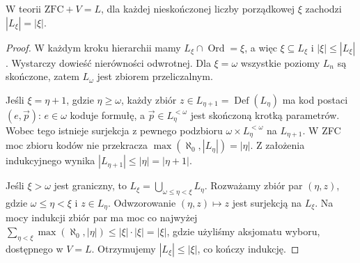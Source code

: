 \begin{lemat}
\label{lem:l-level-cardinality}
W teorii $\mathrm{ZFC}+V=L$, dla każdej nieskończonej liczby
porządkowej $\xi$ zachodzi $|L_\xi|=|\xi|$.
\end{lemat}
\begin{proof}
W każdym kroku hierarchii mamy $L_\xi\cap\operatorname{Ord}=\xi$,
a więc $\xi\subseteq L_\xi$ i $|\xi|\le |L_\xi|$.
Wystarczy dowieść nierówności odwrotnej. Dla $\xi=\omega$
wszystkie poziomy $L_n$ są skończone, zatem $L_\omega$
jest zbiorem przeliczalnym.

Jeśli $\xi=\eta+1$, gdzie $\eta\ge\omega$, każdy zbiór
$z\in L_{\eta+1}=\operatorname{Def}(L_\eta)$ ma kod postaci
$(e,\vec p)$: $e\in\omega$ koduje formułę, a
$\vec p\in L_\eta^{<\omega}$ jest skończoną krotką parametrów.
Wobec tego istnieje surjekcja z pewnego podzbioru
$\omega\times L_\eta^{<\omega}$ na $L_{\eta+1}$.
W ZFC moc zbioru kodów nie przekracza
$\max(\aleph_0,|L_\eta|)=|\eta|$.
Z założenia indukcyjnego wynika
$|L_{\eta+1}|\le|\eta|=|\eta+1|$.

Jeśli $\xi>\omega$ jest graniczny, to
$L_\xi=\bigcup_{\omega\le\eta<\xi}L_\eta$.
Rozważamy zbiór par $(\eta,z)$, gdzie
$\omega\le\eta<\xi$ i $z\in L_\eta$.
Odwzorowanie $(\eta,z)\mapsto z$ jest surjekcją na $L_\xi$.
Na mocy indukcji zbiór par ma moc co najwyżej
$\sum_{\eta<\xi}\max(\aleph_0,|\eta|)\le
|\xi|\cdot|\xi|=|\xi|$, gdzie użyliśmy aksjomatu
wyboru, dostępnego w $V=L$. Otrzymujemy
$|L_\xi|\le|\xi|$, co kończy indukcję.
\end{proof}

